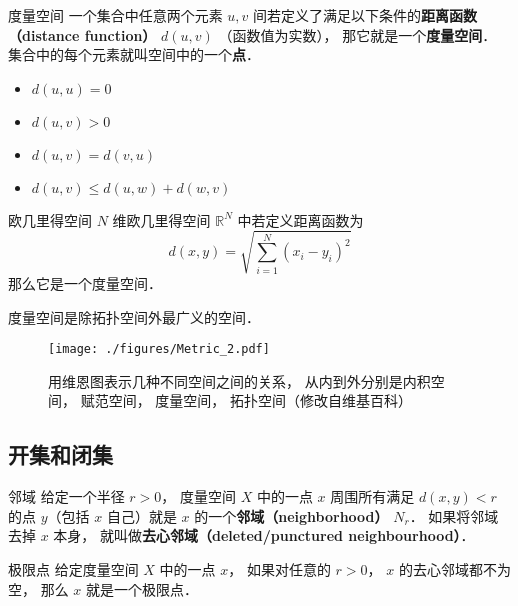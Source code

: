 

\begin{definition}{度量空间}
一个集合中任意两个元素 $u, v$ 间若定义了满足以下条件的\textbf{距离函数（distance function）} $d(u, v)$ （函数值为实数）， 那它就是一个\textbf{度量空间}． 集合中的每个元素就叫空间中的一个\textbf{点}．
\begin{itemize}
\item $d(u, u) = 0$
\item $d(u, v) > 0$
\item $d(u, v) = d(v, u)$
\item $d(u, v) \leqslant d(u, w) + d(w, v)$
\end{itemize}
\end{definition}

\begin{exercise}{欧几里得空间}
$N$ 维欧几里得空间 $\mathbb R^N$ 中若定义距离函数为
\begin{equation}
d(x, y) = \sqrt{\sum_{i=1}^N (x_i - y_i)^2}
\end{equation}
那么它是一个度量空间．
\end{exercise}

度量空间是除拓扑空间外最广义的空间．
\begin{figure}[ht]
\centering
\texttt{[image: ./figures/Metric\_2.pdf]}
\caption{用维恩图表示几种不同空间之间的关系， 从内到外分别是内积空间， 赋范空间， 度量空间， 拓扑空间（修改自维基百科）} \label{Metric_fig2}
\end{figure}

\subsection{开集和闭集}

\begin{definition}{邻域}
给定一个半径 $r > 0$， 度量空间 $X$ 中的一点 $x$ 周围所有满足 $d(x, y) < r$ 的点 $y$（包括 $x$ 自己）就是 $x$ 的一个\textbf{邻域（neighborhood）} $N_r$． 如果将邻域去掉 $x$ 本身， 就叫做\textbf{去心邻域（deleted/punctured neighbourhood）}．
\end{definition}

\begin{definition}{极限点}
给定度量空间 $X$ 中的一点 $x$， 如果对任意的 $r > 0$， $x$ 的去心邻域都不为空， 那么 $x$ 就是一个极限点．
\end{definition}


